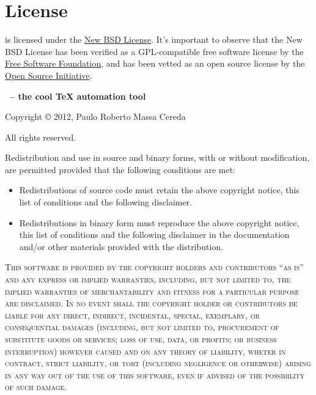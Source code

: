 \documentclass[a4paper,twoside,12pt]{memoir}
\begin{document}
\cleardoublepage

\section*{License}
\label{sec:license}

\arara is licensed under the 
\href{http://www.opensource.org/licenses/bsd-license.php}{New BSD License}. It's
important to observe that the New BSD License has been verified as a 
GPL-compatible free software license by the 
\href{http://www.fsf.org/}{Free Software Foundation}, and has been vetted as an 
open source license by the 
\href{http://www.opensource.org/}{Open Source Initiative}.

\vfill

\begin{infobox}[skipabove=\baselineskip plus 2pt minus 1pt]
\noindent
\begingroup
  \color{araracolor}\bfseries
  \arara \ -- the cool \TeX{} automation tool
\endgroup

\vspace{.5em}

\noindent Copyright \copyright{} 2012, Paulo Roberto Massa Cereda

\noindent All rights reserved.

\vspace{1em}

\noindent Redistribution and use in source and binary forms, with or without
modification, are permitted provided that the following conditions are met:

\vspace{1em}

\begin{itemize}
\item Redistributions of source code must retain the above copyright notice, 
      this list of conditions and the following disclaimer.
\item Redistributions in binary form must reproduce the above copyright notice,
      this list of conditions and the following disclaimer in the documentation
      and/or other materials provided with the distribution.
\end{itemize}

\vspace{1em}

\noindent\textsc{This software is provided by the copyright holders and 
contributors ``as is'' and any express or implied warranties, including, but not
 limited to, the implied warranties of merchantability and fitness for a 
particular purpose are disclaimed. In no event shall the copyright holder or 
contributors be liable for any direct, indirect, incidental, special, exemplary,
 or consequential damages (including, but not limited to, procurement of 
substitute goods or services; loss of use, data, or profits; or business 
interruption) however caused and on any theory of liability, wheter in contract,
 strict liability, or tort (including negligence or otherwise) arising in any 
way out of the use of this software, even if advised of the possibility of such
damage.}
\end{infobox}
\end{document}
